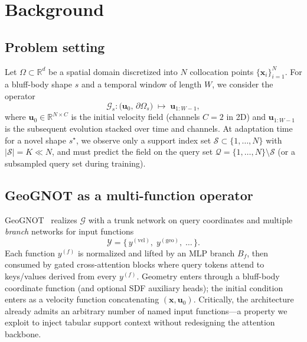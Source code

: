 \documentclass[11pt,a4paper]{article}
\begin{document}
\section{Background}
\label{sec:background}

\subsection{Problem setting}
\label{sec:problem}

Let $\Omega\subset\mathbb{R}^{d}$ be a spatial domain discretized into $N$ collocation points $\{\mathbf{x}_i\}_{i=1}^{N}$.
For a bluff-body shape $s$ and a temporal window of length $W$, we consider the operator
\begin{equation}
\mathcal{G}_{s}:\bigl(\mathbf{u}_{0},\,\partial\Omega_{s}\bigr)\;\mapsto\;\mathbf{u}_{1:W-1},
\end{equation}
where $\mathbf{u}_{0}\in\mathbb{R}^{N\times C}$ is the initial velocity field (channels $C{=}2$ in 2D) and $\mathbf{u}_{1:W-1}$ is the subsequent evolution stacked over time and channels.
At adaptation time for a novel shape $s^{\star}$, we observe only a support index set $\mathcal{S}\subset\{1,\ldots,N\}$ with $|\mathcal{S}|=K\ll N$, and must predict the field on the query set $\mathcal{Q}=\{1,\ldots,N\}\setminus\mathcal{S}$ (or a subsampled query set during training).

\subsection{GeoGNOT as a multi-function operator}
\label{sec:geognot}

GeoGNOT~\cite{hao2023gnot} realizes $\mathcal{G}$ with a trunk network on query coordinates and multiple \emph{branch} networks for input functions
\begin{equation}
\mathcal{Y}=\bigl\{\,y^{(\mathrm{vel})},\; y^{(\mathrm{geo})},\; \ldots\,\bigr\}.
\end{equation}
Each function $y^{(f)}$ is normalized and lifted by an MLP branch $B_f$, then consumed by gated cross-attention blocks where query tokens attend to keys/values derived from every $y^{(f)}$.
Geometry enters through a bluff-body coordinate function (and optional SDF auxiliary heads); the initial condition enters as a velocity function concatenating $(\mathbf{x},\mathbf{u}_{0})$.
Critically, the architecture already admits an arbitrary number of named input functions---a property we exploit to inject tabular support context without redesigning the attention backbone.
\end{document}
